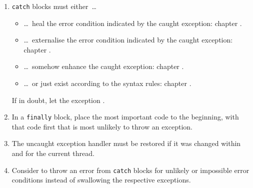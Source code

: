 \begin{enumerate}[label=P\arabic*.]
	\item{\lstinline|catch| blocks must either~…
		\begin{itemize}
			\item{…~heal the error condition indicated by the caught exception: chapter .}
			\item{…~externalise the error condition indicated by the caught exception: chapter .}
			\item{…~somehow enhance the caught exception: chapter .}
			\item{…~or just exist according to the \Java syntax rules: chapter .}
		\end{itemize}
		
	If in doubt, let the exception .}
	
	\item{In a \lstinline|finally| block, place the most important code to the beginning, with that code first that is most unlikely to throw an exception.}
	
	\item{The uncaught exception handler must be restored if it was changed within and for the current thread.}
	
	\item{Consider to throw an error from \lstinline|catch| blocks for unlikely or impossible error conditions instead of swallowing the respective exceptions.}
	

\end{enumerate}
